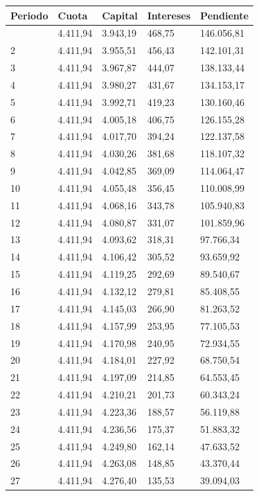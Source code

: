 \documentclass[
  letterpaper,
  DIV=11,
  numbers=noendperiod]{scrreprt}
\begin{document}
\begin{tcolorbox}
\begin{tcolorbox}
\begin{longtable}[]{@{}lllll@{}}
\toprule\noalign{}
Periodo & Cuota & Capital & Intereses & Pendiente \\
\midrule\noalign{}
\endhead
\bottomrule\noalign{}
\endlastfoot
1 & 4.411,94 & 3.943,19 & 468,75 & 146.056,81 \\
2 & 4.411,94 & 3.955,51 & 456,43 & 142.101,31 \\
3 & 4.411,94 & 3.967,87 & 444,07 & 138.133,44 \\
4 & 4.411,94 & 3.980,27 & 431,67 & 134.153,17 \\
5 & 4.411,94 & 3.992,71 & 419,23 & 130.160,46 \\
6 & 4.411,94 & 4.005,18 & 406,75 & 126.155,28 \\
7 & 4.411,94 & 4.017,70 & 394,24 & 122.137,58 \\
8 & 4.411,94 & 4.030,26 & 381,68 & 118.107,32 \\
9 & 4.411,94 & 4.042,85 & 369,09 & 114.064,47 \\
10 & 4.411,94 & 4.055,48 & 356,45 & 110.008,99 \\
11 & 4.411,94 & 4.068,16 & 343,78 & 105.940,83 \\
12 & 4.411,94 & 4.080,87 & 331,07 & 101.859,96 \\
13 & 4.411,94 & 4.093,62 & 318,31 & 97.766,34 \\
14 & 4.411,94 & 4.106,42 & 305,52 & 93.659,92 \\
15 & 4.411,94 & 4.119,25 & 292,69 & 89.540,67 \\
16 & 4.411,94 & 4.132,12 & 279,81 & 85.408,55 \\
17 & 4.411,94 & 4.145,03 & 266,90 & 81.263,52 \\
18 & 4.411,94 & 4.157,99 & 253,95 & 77.105,53 \\
19 & 4.411,94 & 4.170,98 & 240,95 & 72.934,55 \\
20 & 4.411,94 & 4.184,01 & 227,92 & 68.750,54 \\
21 & 4.411,94 & 4.197,09 & 214,85 & 64.553,45 \\
22 & 4.411,94 & 4.210,21 & 201,73 & 60.343,24 \\
23 & 4.411,94 & 4.223,36 & 188,57 & 56.119,88 \\
24 & 4.411,94 & 4.236,56 & 175,37 & 51.883,32 \\
25 & 4.411,94 & 4.249,80 & 162,14 & 47.633,52 \\
26 & 4.411,94 & 4.263,08 & 148,85 & 43.370,44 \\
27 & 4.411,94 & 4.276,40 & 135,53 & 39.094,03 \\

\end{longtable}
\end{tcolorbox}
\end{tcolorbox}
\end{document}
